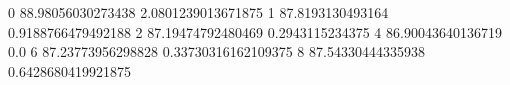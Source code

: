 0 88.98056030273438 2.0801239013671875
1 87.8193130493164 0.9188766479492188
2 87.19474792480469 0.2943115234375
4 86.90043640136719 0.0
6 87.23773956298828 0.33730316162109375
8 87.54330444335938 0.6428680419921875
